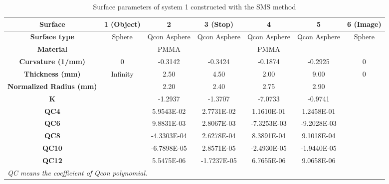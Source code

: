 \begin{table}[h!]
    \centering
    \captionsetup{justification=centering}
    \caption{Surface parameters of system 1 constructed with the SMS method}
    \label{table: chap5 - sys1 - SMS}
    \vspace{-1em}
    \begin{adjustbox}{max width=\textwidth, center}
    \begin{tabular}{c c c c c c c}
    \hline 
     \textbf{Surface} & \textbf{1 (Object)} & \textbf{2} & \textbf{3 (Stop)} & \textbf{4} & \textbf{5} & \textbf{6 (Image)}\\ 
     \midrule
    \rowcolor[gray]{0.9}  \textbf{Surface type} & Sphere & Qcon Asphere & Qcon Asphere & Qcon Asphere & Qcon Asphere & Sphere \\ 
    \textbf{Material} &  & PMMA &  & PMMA & & \\
   \rowcolor[gray]{0.9}  \textbf{Curvature (1/mm)} & 0 & -0.3142 & -0.3424 & -0.1874 &-0.2925 & 0\\
    \textbf{Thickness (mm)} & Infinity & 2.50 & 4.50 & 2.00 & 9.00 & 0 \\ 
    \rowcolor[gray]{0.9} \textbf{Normalized Radius (mm)} & & 2.20 & 2.40 & 2.75 & 2.90 & \\
    \textbf{K} & & -1.2937 & -1.3707 & -7.0733 & -0.9741&\\
    \rowcolor[gray]{0.9} \textbf{QC4} & & 5.9543E-02 & 2.7731E-02 & 1.1610E-01 &  1.2458E-01 &  \\ 
    \textbf{QC6} & &  9.8831E-03 & 2.8067E-03 & -7.3253E-03 & -9.2028E-03 &\\
   \rowcolor[gray]{0.9}  \textbf{QC8} & & -4.3303E-04 &  2.6278E-04 &  8.3891E-04 &  9.1018E-04 & \\
    \textbf{QC10} & & -6.7898E-05 &  2.8571E-05 & -2.4930E-05 & -1.9440E-05 & \\ 
   \rowcolor[gray]{0.9}  \textbf{QC12} & &  5.5475E-06 & -1.7237E-05 &  6.7655E-06 &  9.0658E-06 &\\
    \hline
    \multicolumn{6}{l}{\textit{\footnotesize{QC means the coefficient of Qcon polynomial.}}}\\
    \end{tabular}
    \end{adjustbox}
\end{table}

